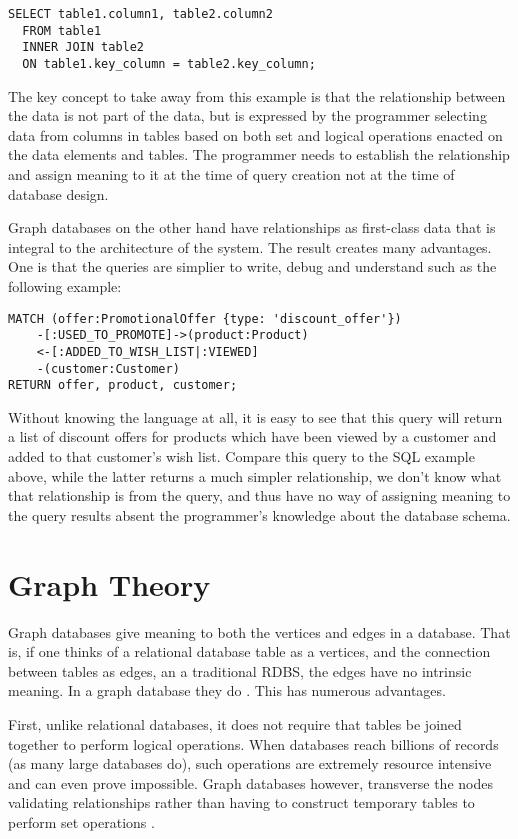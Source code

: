 \begin{lstlisting}[frame=single]
  SELECT table1.column1, table2.column2
  FROM table1
  INNER JOIN table2
  ON table1.key_column = table2.key_column;
  \end{lstlisting}

  The key concept to take away from this example is that the relationship between the data is not part of the data, but is expressed by the programmer selecting data from columns in tables based on both set and logical operations enacted on the data elements and tables. The programmer needs to establish the relationship and assign meaning to it at the time of query creation not at the time of database design.

  Graph databases on the other hand have relationships as first-class data that is integral to the architecture of the system. The result creates many advantages. One  is that the queries are simplier to write, debug and understand such as the following example:

  \begin{lstlisting}[frame=single]
    MATCH (offer:PromotionalOffer {type: 'discount_offer'})
    -[:USED_TO_PROMOTE]->(product:Product)
    <-[:ADDED_TO_WISH_LIST|:VIEWED]
    -(customer:Customer)
RETURN offer, product, customer;
\end{lstlisting}

Without knowing the language at all, it is easy to see that this query will return a list of discount offers for products which have been viewed by a customer and added to that customer's wish list. Compare this query to the SQL example above, while the latter returns a much simpler relationship, we don't know what that relationship is from the query, and thus have no way of assigning meaning to the query results absent the programmer's knowledge about the database schema.

\section{Graph Theory}

Graph databases give meaning to both the vertices and edges in a database. That is, if one thinks of a relational database table as a vertices, and the connection between tables as edges, an a traditional RDBS, the edges have no intrinsic meaning. In a graph database they do \parencite{karunarathnaScalableGraphConvolutional2020}. This has numerous advantages.

First, unlike relational databases, it does not require that tables be joined together to perform logical operations. When databases reach billions of records (as many large databases do), such operations are extremely resource intensive and can even prove impossible. Graph databases however, transverse the nodes validating relationships rather than having to construct temporary tables to perform set operations \parencite{ariasBenefitsGraphDatabases2020}.

